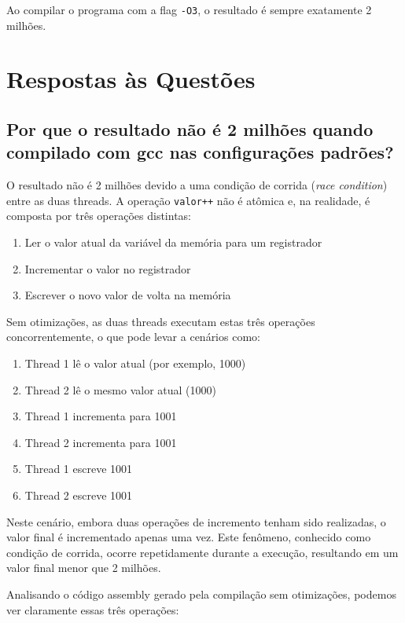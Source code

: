 \documentclass[12pt]{article}
\begin{document}
Ao compilar o programa com a flag \texttt{-O3}, o resultado é sempre exatamente 2 milhões.

\section{Respostas às Questões}

\subsection{Por que o resultado não é 2 milhões quando compilado com gcc nas configurações padrões?}

O resultado não é 2 milhões devido a uma condição de corrida (\textit{race condition}) entre as duas threads. A operação \texttt{valor++} não é atômica e, na realidade, é composta por três operações distintas:

\begin{enumerate}
    \item Ler o valor atual da variável da memória para um registrador
    \item Incrementar o valor no registrador
    \item Escrever o novo valor de volta na memória
\end{enumerate}

Sem otimizações, as duas threads executam estas três operações concorrentemente, o que pode levar a cenários como:

\begin{enumerate}
    \item Thread 1 lê o valor atual (por exemplo, 1000)
    \item Thread 2 lê o mesmo valor atual (1000)
    \item Thread 1 incrementa para 1001
    \item Thread 2 incrementa para 1001
    \item Thread 1 escreve 1001
    \item Thread 2 escreve 1001
\end{enumerate}

Neste cenário, embora duas operações de incremento tenham sido realizadas, o valor final é incrementado apenas uma vez. Este fenômeno, conhecido como condição de corrida, ocorre repetidamente durante a execução, resultando em um valor final menor que 2 milhões.

Analisando o código assembly gerado pela compilação sem otimizações, podemos ver claramente essas três operações:
\end{document}
